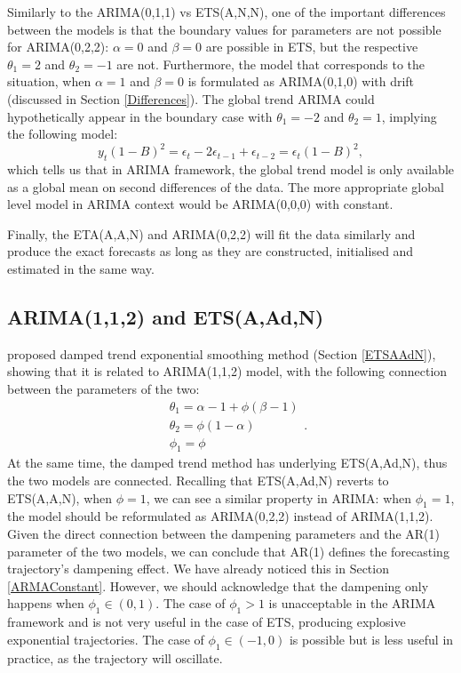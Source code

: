 \documentclass[
]{book}
\theoremstyle{definition}
\theoremstyle{definition}
\theoremstyle{definition}
\theoremstyle{definition}
\theoremstyle{remark}
\begin{document}
Similarly to the ARIMA(0,1,1) vs ETS(A,N,N), one of the important differences between the models is that the boundary values for parameters are not possible for ARIMA(0,2,2): \(\alpha=0\) and \(\beta=0\) are possible in ETS, but the respective \(\theta_1=2\) and \(\theta_2=-1\) are not. Furthermore, the model that corresponds to the situation, when \(\alpha=1\) and \(\beta=0\) is formulated as ARIMA(0,1,0) with drift (discussed in Section \ref{Differences}). The global trend ARIMA could hypothetically appear in the boundary case with \(\theta_1=-2\) and \(\theta_2=1\), implying the following model:
\begin{equation*}
    y_t (1 -B)^2 = \epsilon_t -2\epsilon_{t-1} + \epsilon_{t-2} = \epsilon_t (1 -B)^2 ,
\end{equation*}
which tells us that in ARIMA framework, the global trend model is only available as a global mean on second differences of the data. The more appropriate global level model in ARIMA context would be ARIMA(0,0,0) with constant.

Finally, the ETA(A,A,N) and ARIMA(0,2,2) will fit the data similarly and produce the exact forecasts as long as they are constructed, initialised and estimated in the same way.

\hypertarget{ARIMAETS112}{%
\subsection{ARIMA(1,1,2) and ETS(A,Ad,N)}\label{ARIMAETS112}}

\citet{Roberts1982} proposed damped trend exponential smoothing method (Section \ref{ETSAAdN}), showing that it is related to ARIMA(1,1,2) model, with the following connection between the parameters of the two:
\begin{equation*}
  \begin{aligned}
    &\theta_1 = \alpha -1 + \phi (\beta -1) \\
    &\theta_2 = \phi(1 -\alpha) \\
    &\phi_1 = \phi
  \end{aligned} .
\end{equation*}
At the same time, the damped trend method has underlying ETS(A,Ad,N), thus the two models are connected. Recalling that ETS(A,Ad,N) reverts to ETS(A,A,N), when \(\phi=1\), we can see a similar property in ARIMA: when \(\phi_1=1\), the model should be reformulated as ARIMA(0,2,2) instead of ARIMA(1,1,2). Given the direct connection between the dampening parameters and the AR(1) parameter of the two models, we can conclude that AR(1) defines the forecasting trajectory's dampening effect. We have already noticed this in Section \ref{ARMAConstant}. However, we should acknowledge that the dampening only happens when \(\phi_1 \in (0,1)\). The case of \(\phi_1>1\) is unacceptable in the ARIMA framework and is not very useful in the case of ETS, producing explosive exponential trajectories. The case of \(\phi_1 \in (-1, 0)\) is possible but is less useful in practice, as the trajectory will oscillate.
\end{document}
